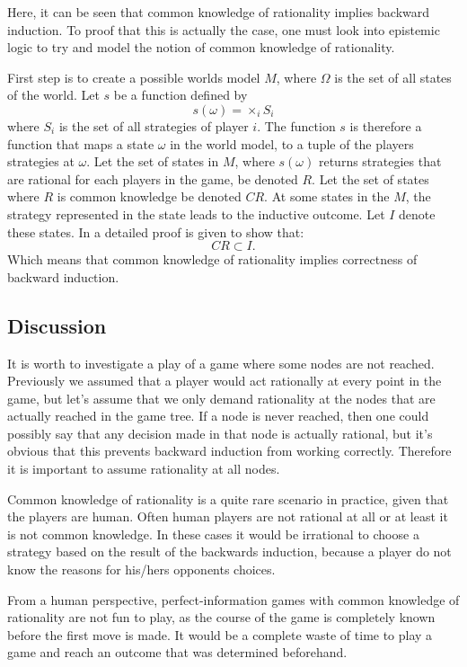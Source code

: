 Here, it can be seen that common knowledge of rationality implies backward induction. To proof that this is actually the case, one must look into epistemic logic to try and model the notion of common knowledge of rationality. 

First step is to create a possible worlds model $M$, where $\Omega$ is the set of all states of the world. 
Let $s$  be a function defined by
$$
s(\omega) = \times_i S_i
$$
where $S_i$ is the set of all strategies of player $i$. The function $s$ is therefore a function that maps a state $\omega$ in the world model, to a tuple of the players strategies at $\omega$.
Let the set of states in $M$, where $s(\omega)$ returns strategies that are rational for each players in the game, be denoted $R$. Let the set of states where $R$ is common knowledge be denoted $CR$. At some states in the $M$, the strategy represented in the state leads to the inductive outcome. Let $I$ denote these states.
In \cite{aumann1995a} a detailed proof is given to show that:
$$
CR \subset I.
$$
Which means that common knowledge of rationality implies correctness of backward induction.

\subsection{Discussion}
It is worth to investigate a play of a game where some nodes are not reached. Previously we assumed that a player would act rationally at every point in the game, but let's assume that we only demand rationality at the nodes that are actually reached in the game tree.
If a node is never reached, then one could possibly say that any decision made in that node is actually rational, but it's obvious that this prevents backward induction from working correctly. Therefore it is important to assume rationality at all nodes.

Common knowledge of rationality is a quite rare scenario in practice, given that the players are human. Often human players are not rational at all or at least it is not common knowledge. In these cases it would be irrational to choose a strategy based on the result of the backwards induction, because a player do not know the reasons for his/hers opponents choices.

From a human perspective, perfect-information games with common knowledge of rationality are not fun to play, as the course of the game is completely known before the first move is made. It would be a complete waste of time to play a game and reach an outcome that was determined beforehand.
